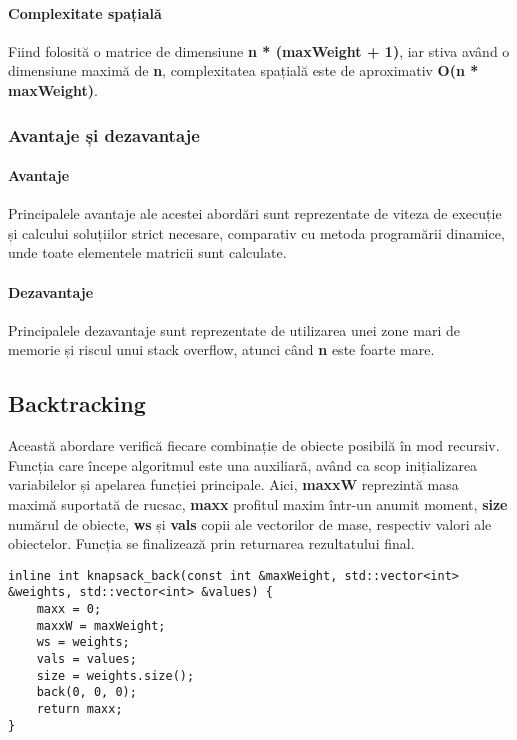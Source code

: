 \documentclass[runningheads]{llncs}
\begin{document}
{\paragraph{Complexitate spațială} Fiind folosită o matrice de dimensiune \textbf{n * (maxWeight + 1)},
iar stiva având o dimensiune maximă de \textbf{n}, complexitatea spațială este de aproximativ
\textbf{O(n * maxWeight)}.

\subsubsection{Avantaje și dezavantaje}

\paragraph{Avantaje} Principalele avantaje ale acestei abordări sunt reprezentate de viteza
de execuție și calcului soluțiilor strict necesare, comparativ cu metoda programării dinamice,
unde toate elementele matricii sunt calculate.

\paragraph{Dezavantaje} Principalele dezavantaje sunt reprezentate de utilizarea unei zone mari de memorie
și riscul unui stack overflow, atunci când \textbf{n} este foarte mare.

\subsection{Backtracking}

Această abordare verifică fiecare combinație de obiecte posibilă în mod recursiv. Funcția care începe
algoritmul este una auxiliară, având ca scop inițializarea variabilelor și apelarea funcției principale.
Aici, \textbf{maxxW} reprezintă masa maximă suportată de rucsac, \textbf{maxx} profitul maxim într-un anumit
moment, \textbf{size} numărul de obiecte, \textbf{ws} și \textbf{vals} copii ale vectorilor de mase, respectiv
valori ale obiectelor. Funcția se finalizează prin returnarea rezultatului final.

\begin{lstlisting}
inline int knapsack_back(const int &maxWeight, std::vector<int> &weights, std::vector<int> &values) {
	maxx = 0;
	maxxW = maxWeight;
	ws = weights;
	vals = values;
	size = weights.size();
	back(0, 0, 0);
	return maxx;
}
\end{lstlisting}

}
\end{document}
